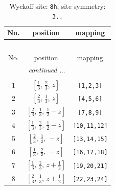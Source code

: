 \documentclass[fleqn,8pt]{jsarticle}
\begin{document}
\begin{longtable}{ccc}
\caption{Wyckoff site: {\tt 8h}, site symmetry: {\tt 3..}}
 \\
 \hline \hline
No. & position & mapping \\ \hline \endfirsthead

\multicolumn{2}{l}{\tablename\ \thetable{}} \\
 \hline \hline
No. & position & mapping \\ \hline \endhead

 \hline \hline
\multicolumn{2}{r}{\footnotesize\it continued ...} \\ \endfoot

 \hline \hline
\multicolumn{2}{r}{} \\ \endlastfoot

1 & $\left[ \frac{1}{3},\, \frac{2}{3},\, z \right]$ & {\tt [1,2,3]} \\ \hline
2 & $\left[ \frac{2}{3},\, \frac{1}{3},\, z \right]$ & {\tt [4,5,6]} \\ \hline
3 & $\left[ \frac{2}{3},\, \frac{1}{3},\, \frac{1}{2} - z \right]$ & {\tt [7,8,9]} \\ \hline
4 & $\left[ \frac{1}{3},\, \frac{2}{3},\, \frac{1}{2} - z \right]$ & {\tt [10,11,12]} \\ \hline
5 & $\left[ \frac{2}{3},\, \frac{1}{3},\, - z \right]$ & {\tt [13,14,15]} \\ \hline
6 & $\left[ \frac{1}{3},\, \frac{2}{3},\, - z \right]$ & {\tt [16,17,18]} \\ \hline
7 & $\left[ \frac{1}{3},\, \frac{2}{3},\, z + \frac{1}{2} \right]$ & {\tt [19,20,21]} \\ \hline
8 & $\left[ \frac{2}{3},\, \frac{1}{3},\, z + \frac{1}{2} \right]$ & {\tt [22,23,24]} \\
\end{longtable}
\renewcommand{\arraystretch}{1.2}
\end{document}
